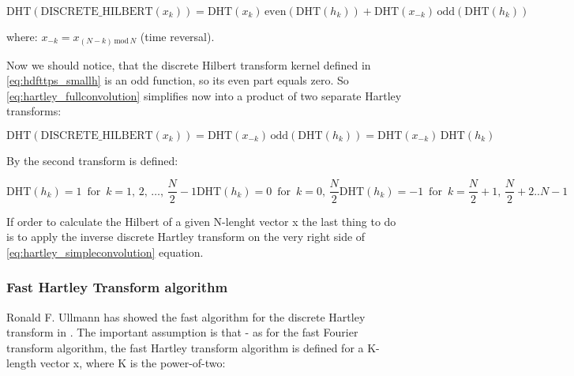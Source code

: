 \documentclass[12pt,twoside,a4paper]{article}
\numberwithin{equation}{subsection}
\numberwithin{figure}{subsection}
\begin{document}
\begin{equation} \label{eq:hartley_fullconvolution}
  \mathrm{DHT}(\mathrm{DISCRETE\_HILBERT}({x_{k}}))=\mathrm{DHT}({x_{k}})\,\mathrm{even}(\mathrm{DHT}({h_{k}})) +
  \mathrm{DHT}({x_{- k}})\,\mathrm{odd}(\mathrm{DHT}({h_{k}}))
\end{equation} 

where: ${x_{ - k}}={x_{(N - k)\,\mathrm{mod}\,N}}$ (time reversal).

Now we should notice, that the discrete Hilbert transform kernel defined in \ref{eq:hdfttps_smallh} is an odd function, so its even
part equals zero. So \ref{eq:hartley_fullconvolution} simplifies now into a product of two separate Hartley transforms:

\begin{equation} \label{eq:hartley_simpleconvolution}
  \mathrm{DHT}(\mathrm{DISCRETE\_HILBERT}({x_{k}}))=\mathrm{DHT}({x_{ - k}})\,\mathrm{odd}(\mathrm{DHT}({h_{k}})) =
  \mathrm{DHT}({x_{- k}})\,\mathrm{DHT}({h_{k}})
\end{equation}

By \cite{chang_computation} the second transform is defined:

\begin{subequations} \label{eq:hartley_strans} 
  \begin{equation}   \label{eq:hstrans_fhalf}
    \mathrm{DHT}({h_{k}})=1\, \mbox{ for }\, k=1, \,2,\,\ldots,\,\frac {N}{2} - 1
  \end{equation}
  \begin{equation}   \label{eq:hstrans_middle}
    \mathrm{DHT}({h_{k}})=0\, \mbox{ for }\, k=0, \,\frac {N}{2}
  \end{equation}
  \begin{equation}   \label{eq:hstrans_shalf}
    \mathrm{DHT}({h_{k}})= - 1\, \mbox{ for }\, k=\frac {N}{2} + 1, \,\frac {N}{2} + 2 .. N - 1
  \end{equation}
\end{subequations}

If order to calculate the Hilbert of a given N-lenght vector x the last thing to do is to apply the inverse discrete Hartley
transform on the very right side of \ref{eq:hartley_simpleconvolution} equation.

\subsubsection*{Fast Hartley Transform algorithm}

Ronald F. Ullmann has showed the fast algorithm for the discrete Hartley transform in \cite{ullmann_algorithm}. The important
assumption is that - as for the fast Fourier transform algorithm, the fast Hartley transform algorithm is defined for a K-length
vector x, where K is the power-of-two:
\end{document}
